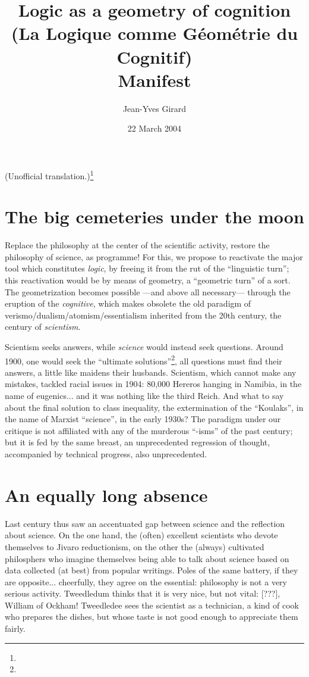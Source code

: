 \documentclass{article}
\author{Jean-Yves Girard}
\title{Logic as a geometry of cognition \\ (La Logique comme Géométrie du Cognitif) \\ Manifest}
\date{22 March 2004}
\begin{document}
\maketitle
\noindent
(Unofficial translation.)\footnote{}

\section{The big cemeteries under the moon}
Replace the philosophy at the center of the scientific activity, restore the philosophy of science, as programme! For this, we propose to reactivate the major tool which constitutes \emph{logic}, by freeing it from the rut of the \enquote{linguistic turn}; this reactivation would be by means of geometry, a \enquote{geometric turn} of a sort. The geometrization becomes possible ---and above all necessary--- through the eruption of the \emph{cognitive}, which makes obsolete the old paradigm of verismo/dualism/atomism/essentialism inherited from the 20th century, the century of \emph{scientism}.

Scientism seeks answers, while \emph{science} would instead seek questions. Around 1900, one would seek the \enquote{ultimate solutions}\footnote{}, all questions must find their answers, a little like maidens their husbands. Scientism, which cannot make any mistakes, tackled racial issues in 1904: 80,000 Hereros hanging in Namibia, in the name of eugenics... and it was nothing like the third Reich. And what to say about the final solution to class inequality, the extermination of the \enquote{Koulaks}, in the name of Marxist \enquote{science}, in the early 1930s? The paradigm under our critique is not affiliated with any of the murderous \enquote{-isms} of the past century; but it is fed by the same breast, an unprecedented regression of thought, accompanied by technical progress, also unprecedented.

\section{An equally long absence}
Last century thus saw an accentuated gap between science and the reflection about science. On the one hand, the (often) excellent scientists who devote themselves to Jivaro reductionism, on the other the (always) cultivated philosphers who imagine themselves being able to talk about science based on data collected (at best) from popular writings. Poles of the same battery, if they are opposite... cheerfully, they agree on the essential: philosophy is not a very serious activity. Tweedledum thinks that it is very nice, but not vital: [???], William of Ockham! Tweedledee sees the scientist as a technician, a kind of cook who prepares the dishes, but whose taste is not good enough to appreciate them fairly.
\end{document}
